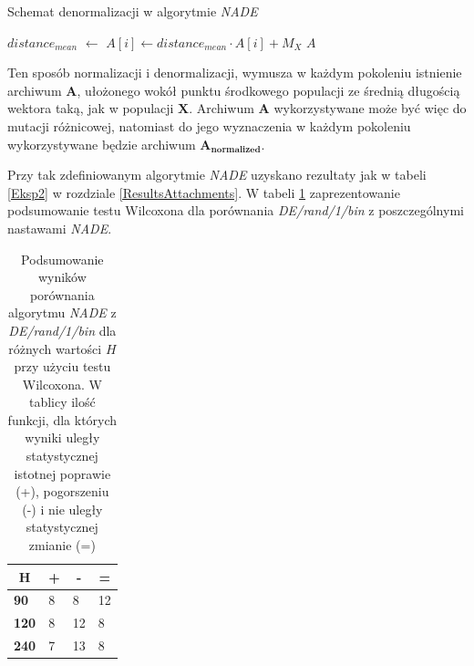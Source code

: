 \documentclass[12pt,a4paper]{report}
\begin{document}
{{{{{{{\begin{algorithm}[H]
\caption{Schemat denormalizacji w algorytmie \emph{NADE}}
\label{algorithm:ea}
\begin{algorithmic}[1]
	\State $distance_{mean}$ $\gets$ 
        \State $A[i] \gets distance_{mean} \cdot A[i] + M_{X}$
    \EndFor
    \State \Return $A$
\EndFunction
\end{algorithmic}
\end{algorithm}
}
\par{
Ten sposób normalizacji i denormalizacji, wymusza w każdym pokoleniu istnienie archiwum $\mathbf{A}$, ułożonego wokół punktu środkowego populacji ze średnią długością wektora taką, jak w populacji $\mathbf{X}$. Archiwum $\mathbf{A}$ wykorzystywane może być więc do mutacji różnicowej, natomiast do jego wyznaczenia w każdym pokoleniu wykorzystywane będzie archiwum $\mathbf{A_{normalized}}$.
}
\par{
Przy tak zdefiniowanym algorytmie \emph{NADE} uzyskano rezultaty jak w tabeli \ref{Eksp2} w rozdziale \ref{ResultsAttachments}. W tabeli \ref{eks2summary} zaprezentowanie podsumowanie testu Wilcoxona dla porównania \emph{DE/rand/1/bin} z poszczególnymi nastawami \emph{NADE}.
\begin{table}[h]
\centering
\caption{Podsumowanie wyników porównania algorytmu \emph{NADE} z \emph{DE/rand/1/bin} dla różnych wartości $H$ przy użyciu testu Wilcoxona. W tablicy ilość funkcji, dla których wyniki uległy statystycznej istotnej poprawie (+), pogorszeniu (-) i nie uległy statystycznej zmianie (=)}
\label{eks2summary}
\begin{tabular}{|l|l|l|l|}
\hline
\multicolumn{1}{|c|}{{\bf H}} & \multicolumn{1}{c|}{{\bf +}} & \multicolumn{1}{c|}{{\bf -}} & \multicolumn{1}{c|}{{\bf =}} \\ \hline
{\bf 90}  & 8 & 8  & 12 \\ \hline
{\bf 120} & 8 & 12 & 8  \\ \hline
{\bf 240} & 7 & 13 & 8  \\ \hline
\end{tabular}
\end{table}
}
}}}}}}
\end{document}
